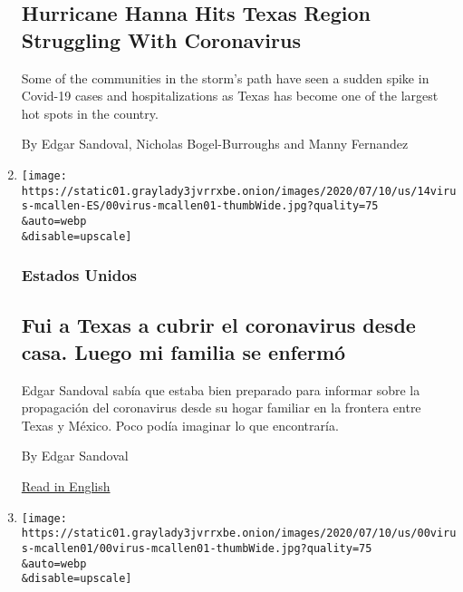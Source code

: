 \begin{enumerate}
{  \subsection{Hurricane Hanna Hits Texas Region Struggling With
  Coronavirus}\label{hurricane-hanna-hits-texas-region-struggling-with-coronavirus}}

  Some of the communities in the storm's path have seen a sudden spike
  in Covid-19 cases and hospitalizations as Texas has become one of the
  largest hot spots in the country.

  By Edgar Sandoval, Nicholas Bogel-Burroughs and Manny Fernandez
\item
  \href{/es/2020/07/14/espanol/texas-coronavirus-rio-grande-valley.html}{}

  \texttt{[image: https://static01.graylady3jvrrxbe.onion/images/2020/07/10/us/14virus-mcallen-ES/00virus-mcallen01-thumbWide.jpg?quality=75\\\&auto=webp\\\&disable=upscale]}

  \hypertarget{estados-unidos}{%
  \subsubsection{Estados Unidos}\label{estados-unidos}}

  \hypertarget{fui-a-texas-a-cubrir-el-coronavirus-desde-casa-luego-mi-familia-se-enfermuxf3}{%
  \subsection{Fui a Texas a cubrir el coronavirus desde casa. Luego mi
  familia se
  enfermó}\label{fui-a-texas-a-cubrir-el-coronavirus-desde-casa-luego-mi-familia-se-enfermuxf3}}

  Edgar Sandoval sabía que estaba bien preparado para informar sobre la
  propagación del coronavirus desde su hogar familiar en la frontera
  entre Texas y México. Poco podía imaginar lo que encontraría.

  By Edgar Sandoval

  \href{https://www.nytimes3xbfgragh.onion/2020/07/14/us/coronavirus-texas-rio-grande-valley-border.html}{Read
  in English}
\item
  \href{/2020/07/14/us/coronavirus-texas-rio-grande-valley-border.html}{}

  \texttt{[image: https://static01.graylady3jvrrxbe.onion/images/2020/07/10/us/00virus-mcallen01/00virus-mcallen01-thumbWide.jpg?quality=75\\\&auto=webp\\\&disable=upscale]}

  \hypertarget{i-went-home-to-texas-to-cover-the-virus-then-my-family-got-it}{%
}
\end{enumerate}
